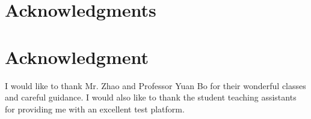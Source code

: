 \documentclass[conference,compsoc]{IEEEtran}
\begin{document}
\ifCLASSOPTIONcompsoc
  \section*{Acknowledgments}
\else
  \section*{Acknowledgment}
\fi

I would like to thank Mr. Zhao and Professor Yuan Bo for their wonderful classes and careful guidance. I would also like to thank the student teaching assistants for providing me with an excellent test platform.






\end{document}
